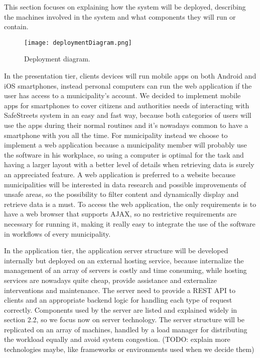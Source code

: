 This section focuses on explaining how the system will be deployed, describing the machines involved in the system and what components they will run or contain.

\begin{figure}[H]
	\centering
	\texttt{[image: deploymentDiagram.png]}
	\caption{Deployment diagram.}
\end{figure}

In the presentation tier, clients devices will run mobile apps on both Android and iOS smartphones, instead personal computers can run the web application if the user has access to a municipality's account. We decided to implement mobile apps for smartphones to cover citizens and authorities needs of interacting with SafeStreets system in an easy and fast way, because both categories of users will use the apps during their normal routines and it's nowadays common to have a smartphone with you all the time. For municipality instead we choose to implement a web application because a municipality member will probably use the software in his workplace, so using a computer is optimal for the task and having a larger layout with a better level of details when retrieving data is surely an appreciated feature. A web application is preferred to a website because municipalities will be interested in data research and possible improvements of unsafe areas, so the possibility to filter content and dynamically display and retrieve data is a must. To access the web application, the only requirements is to have a web browser that supports AJAX, so no restrictive requirements are necessary for running it, making it really easy to integrate the use of the software in workflows of every municipality.

In the application tier, the application server structure will be developed internally but deployed on an external hosting service, because internalize the management of an array of servers is costly and time consuming, while hosting services are nowadays quite cheap, provide assistance and externalize interventions and maintenance. The server need to provide a REST API to clients and an appropriate backend logic for handling each type of request correctly. Components used by the server are listed and explained widely in section 2.2, so we focus now on server technology. The server structure will be replicated on an array of machines, handled by a load manager for distributing the workload equally and avoid system congestion. (TODO: explain more technologies maybe, like frameworks or environments used when we decide them)

